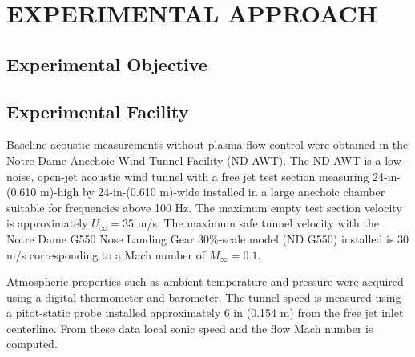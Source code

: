 %
%
%
%
%
%
%
%
%
%


%
%

\chapter{EXPERIMENTAL APPROACH}

\section{Experimental Objective}

\section{Experimental Facility}
Baseline acoustic measurements without plasma flow control were obtained in the Notre Dame Anechoic Wind Tunnel Facility (ND AWT). The ND AWT is a low-noise, open-jet acoustic wind tunnel with a free jet test section measuring 24-in-(0.610 m)-high by 24-in-(0.610 m)-wide installed in a large anechoic chamber suitable for frequencies above 100 Hz. The maximum empty test section velocity is approximately $U_\infty = 35$ m/s. The maximum safe tunnel velocity with the Notre Dame G550 Nose Landing Gear 30\%-scale model (ND G550) installed is  30 m/s corresponding to a Mach number of $M_\infty=0.1$.

Atmospheric properties such as ambient temperature and pressure were acquired using a digital thermometer and barometer. The tunnel speed is measured using a pitot-static probe installed approximately 6 in (0.154 m) from the free jet inlet centerline. From these data local sonic speed and the flow Mach number is computed.

